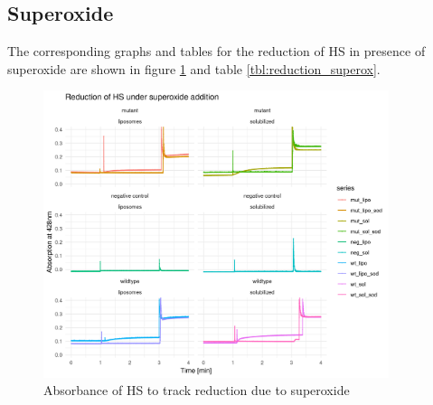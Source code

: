 \subsection{Superoxide}

The corresponding graphs and tables for the reduction of HS in presence of
superoxide are shown in figure \ref{fig:reduction_superox} and table
\ref{tbl:reduction_superox}.

\begin{figure}
	\centering
	\includegraphics[width=0.9\textwidth]{img/reduction_superox.png}
	\caption{Absorbance of HS to track reduction due to superoxide}
	\label{fig:reduction_superox}
\end{figure}

